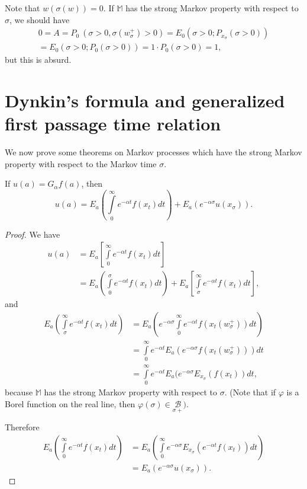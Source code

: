 Note that $w (\sigma (w)) = 0$. If $\mathbb{M}$ has the strong Markov
property with respect to $\sigma$, we should have 
\begin{multline*}
  0=A=P_0 ~ ( \sigma > 0, \sigma(w^+_\sigma) > 0 ) = E_0 ( \sigma > 0;
  P_{x_{\sigma}} ( \sigma > 0 ))\\ 
  = E_0 ( \sigma > 0; P_0 ( \sigma > 0 ))
  = 1 \cdot P_0 (\sigma > 0) = 1, 
\end{multline*}\pageoriginale
but this is absurd.

\section[Dynkin's formula and generalized ...]{Dynkin's formula and generalized first passage time relation}\label{chap2-sec6}

We now prove some theorems on Markov processes which have the strong
Markov property with respect to the Markov time $\sigma$. 

\setcounter{thm}{0}
\begin{thm}[Dynkin]\label{chap2-sec6-thm1}%
  If $u (a) = G_\alpha f (a)$, then 
  $$
  u (a) = E_a \left( \int \limits^{\infty}_{0} e^{-\alpha t} f (x_t) dt\right) +
  E_a ( e^{-\alpha \sigma} u (x_\sigma )). 
  $$
\end{thm}

\begin{proof}
We have
\begin{align*}
    u (a) &= E_a \left[\int \limits^{\infty}_{0} e^{-\alpha t} f(x_t) dt \right]\\
    &= E_a \left( \int \limits^{\sigma}_{0} e^{-\alpha t} f (x_t) dt\right) +
    E_a \left[\int \limits^{\infty}_{\sigma} e^{-\alpha t} f(x_t) dt\right],
\end{align*}
and 
\begin{align*}
    E_a \left( \int \limits^{\infty}_{\sigma} e^{-\alpha t} f(x_t) dt\right) &=
    E_a \left( e^{-\alpha \sigma} \int \limits^{\infty}_{0} e^{-\alpha t}
    f(x_t (w^+_\sigma )) dt\right)\\ 
    &=  \int \limits^{\infty}_{0} e^{-\alpha t}  E_a ( e^{- \alpha
      \sigma}  f (x_t (w^+_\sigma ))) dt \\ 
    &= \int \limits^{\infty}_{0} e^{-\alpha t} E_a ( e^{- \alpha
      \sigma} E_{x_{\sigma}} (f (x_t)) dt, 
\end{align*}
because $\mathbb{M}$ has the strong Markov property with respect to
$\sigma$. (Note that\pageoriginale 
if $\varphi$ is a Borel function on the real
line, then $\varphi (\sigma) \in  \underset{\sigma +}{\mathscr{B}} )$.  


Therefore 
\begin{align*}
  E_a \left(\int \limits^{\infty}_{0} e^{-\alpha t} f(x_t) dt\right) &= E_a
  \left(\int \limits^{\infty}_{0} e^{-\alpha \sigma} E_{x_{\sigma}}
  (e^{-\alpha t}f(x_t)) dt \right)\\ 
  &= E_a (e^{-\alpha \sigma} u (x_\sigma )).
\end{align*}
\end{proof}

